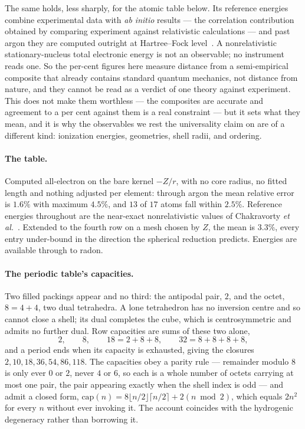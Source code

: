 \documentclass[11pt]{article}
\begin{document}
The same holds, less sharply, for the atomic table below. Its reference energies combine
experimental data with \emph{ab initio} results --- the correlation contribution obtained by
comparing experiment against relativistic calculations --- and past argon they are computed
outright at Hartree--Fock level~\cite{Chakravorty}. A nonrelativistic stationary-nucleus total
electronic energy is not an observable; no instrument reads one. So the per-cent figures here
measure distance from a semi-empirical composite that already contains standard quantum mechanics,
not distance from nature, and they cannot be read as a verdict of one theory against experiment.
This does not make them worthless --- the composites are accurate and agreement to a per cent
against them is a real constraint --- but it sets what they mean, and it is why the observables we
rest the universality claim on are of a different kind: ionization energies, geometries, shell
radii, and ordering.

\paragraph{The table.} Computed all-electron on the bare kernel $-Z/r$, with no core radius, no
fitted length and nothing adjusted per element: through argon the mean relative error is $1.6\%$
with maximum $4.5\%$, and $13$ of $17$ atoms fall within $2.5\%$. Reference energies throughout are the near-exact nonrelativistic
values of Chakravorty \emph{et al.}~\cite{Chakravorty}. Extended to the fourth row on a
mesh chosen by $Z$, the mean is $3.3\%$, every entry under-bound in the direction the spherical
reduction predicts. Energies are available through to radon.

\paragraph{The periodic table's capacities.} Two filled packings appear and no third: the
antipodal pair, $2$, and the octet, $8 = 4{+}4$, two dual tetrahedra. A lone tetrahedron has no
inversion centre and so cannot close a shell; its dual completes the cube, which is
centrosymmetric and admits no further dual. Row capacities are sums of these two alone,
\[
2,\qquad 8,\qquad 18 = 2{+}8{+}8,\qquad 32 = 8{+}8{+}8{+}8,
\]
and a period ends when its capacity is exhausted, giving the closures
$2, 10, 18, 36, 54, 86, 118$. The capacities obey a parity rule --- remainder modulo $8$ is only
ever $0$ or $2$, never $4$ or $6$, so each is a whole number of octets carrying at most one pair,
the pair appearing exactly when the shell index is odd --- and admit a closed form,
$\mathrm{cap}(n) = 8\lfloor n/2\rfloor\lceil n/2\rceil + 2(n \bmod 2)$, which equals $2n^2$ for
every $n$ without ever invoking it. The account coincides with the hydrogenic degeneracy rather
than borrowing it.
\end{document}
